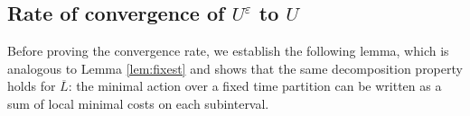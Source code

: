 \documentclass[reqno,11pt]{amsart}
\numberwithin{equation}{section}
\newcommand{\e}{\varepsilon}
\renewcommand{\bar}{\overline}
\begin{document}


\subsection{Rate of convergence of $U^\e$ to $U$}

Before proving the convergence rate, we establish the following lemma, which is analogous to Lemma \ref{lem:fixest} and shows that the same decomposition property holds for $\bar{L}$: the minimal action over a fixed time partition can be written as a sum of local minimal costs on each subinterval.
\end{document}
